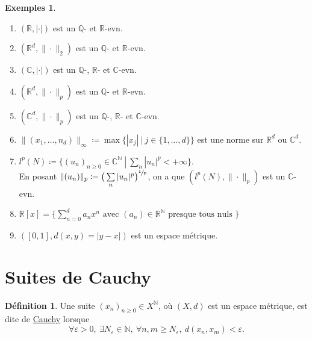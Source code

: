 \documentclass{report}
\newcommand{\Nepsilon}{N_\varepsilon}
\newcommand{\reels}{\mathbb{R}}
\newcommand{\naturals}{\mathbb{N}}
\newcommand{\rationals}{\mathbb{Q}}
\newcommand{\complex}{\mathbb{C}}
\theoremstyle{definition}
\newtheorem{definition}{Définition}
\newtheorem*{examples}{Exemples}
\theoremstyle{plain}
\theoremstyle{remark}
\begin{document}
\begin{examples}
    \begin{enumerate}
        \item{$(\reels, |\cdot|)$ est un $\rationals$- et $\reels$-evn.}
        \item{$(\reels^d, \|\cdot\|_2)$ est un $\rationals$- et $\reels$-evn.}
        \item{$(\complex, |\cdot|)$ est un $\rationals$-, $\reels$- et
            $\complex$-evn.}
        \item{$(\reels^d, \|\cdot\|_p)$ est un $\rationals$- et $\reels$-evn.}
        \item{$(\complex^d, \|\cdot\|_p)$ est un $\rationals$-, $\reels$- et
            $\complex$-evn.}
        \item{$\|(x_1,\dots,n_d)\|_\infty\coloneqq
            \max\{|x_j|\ |\ j\in \{1,\dots,d\}\}$ est une norme sur $\reels^d$
            ou $\complex^d$.}
        \newpage
        \item{$l^p(N) \coloneqq \{(u_n)_{n\ge0}\in\complex^\naturals\ |\ 
            \sum\limits_n |u_n|^p < +\infty\}$. \\
            En posant $ \|(u_n)\|_p \coloneqq \big(\sum\limits_n
            |u_n|^p\big)^{\sfrac{1}{p}}$, on a que $(l^p(N), \|\cdot\|_p)$
            est un $\complex$-evn.}
        \item{$\reels[x] = \{\sum\limits_{n=0}^d a_nx^n \text{ avec }
        (a_n) \in \reels^\naturals \text{ presque tous nuls }\}$}
        \item{$([0,1], d(x, y) = |y-x|)$ est un espace métrique.}
    \end{enumerate}
\end{examples}
\newpage

\section{Suites de Cauchy}

\begin{leftbar}
    \begin{definition}
        Une suite $(x_n)_{n\ge0}\in X^\naturals$, où $(X, d)$ est un espace
        métrique, est dite de \underline{Cauchy} lorsque
        \begin{equation*}
            \forall\varepsilon > 0,\ \exists\Nepsilon\in\naturals,\ 
            \forall n, m\ge\Nepsilon,\ d(x_n, x_m) < \varepsilon.
        \end{equation*}
    \end{definition}
\end{leftbar}
\end{document}
